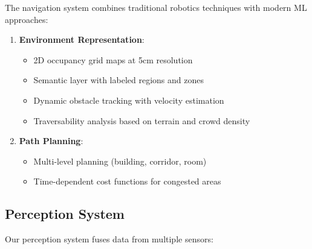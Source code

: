 \documentclass[12pt]{article}
\begin{document}
The navigation system combines traditional robotics techniques with modern ML approaches:

\begin{enumerate}
    \item \textbf{Environment Representation}:
    \begin{itemize}
        \item 2D occupancy grid maps at 5cm resolution
        \item Semantic layer with labeled regions and zones
        \item Dynamic obstacle tracking with velocity estimation
        \item Traversability analysis based on terrain and crowd density
    \end{itemize}
    
    \item \textbf{Path Planning}:
    \begin{itemize}
        \item Multi-level planning (building, corridor, room)
        \item Time-dependent cost functions for congested areas
    \end{itemize}
    
\end{enumerate}

\subsection{Perception System}

Our perception system fuses data from multiple sensors:
\end{document}
